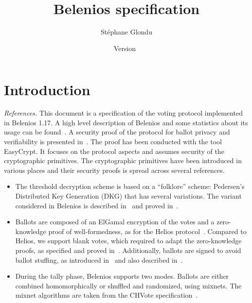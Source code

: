 \documentclass[a4paper]{article}
\title{Belenios specification}
\date{Version~\version}
\author{Stéphane Glondu}
\newcommand{\version}{1.17}
\begin{document}
\maketitle
\tableofcontents

\section{Introduction}
{\it References.}
This document is a specification of the voting protocol implemented in
Belenios \version.
A high level description of Belenios and some statistics about its
usage can be found~\cite{Belenios-Meadows2019}.
A security proof of the protocol for ballot privacy and verifiability
is presented in~\cite{Belenios-Easycrypt-CSF18}. The proof has been conducted with the
tool EasyCrypt. It focuses on the protocol aspects and assumes
security of the cryptographic primitives.
The cryptographic primitives have been introduced in various places
and their security proofs is spread across several references.
\begin{itemize}
\item 
The threshold decryption scheme is
based on a ``folklore'' scheme:
Pedersen’s~\cite{Pedersen} Distributed Key Generation (DKG) that has several variations.
The variant considered in Belenios is described in~\cite{wpes2013} and
proved in~\cite{wpes2013,asiacrypt12}.
\item Ballots are composed of an ElGamal encryption of the votes and a
  zero-knowledge proof of well-formedness, as for the Helios
  protocol~\cite{Helios}. Compared to Helios, we support blank votes,
  which required to adapt the zero-knowledge proofs, as specified and
  proved in~\cite{note-Pierrick}. Additionally, ballots are signed to
  avoid ballot stuffing, as introduced in~\cite{CGGI-esorics14} and also
  described in~\cite{Belenios-Meadows2019}.
  \item During the tally phase, Belenios supports two modes. Ballots are either combined
    homomorphically or shuffled and randomized, using mixnets. The
    mixnet algorithms are taken from the CHVote specification~\cite{CHVote}.
\end{itemize}

\end{document}
